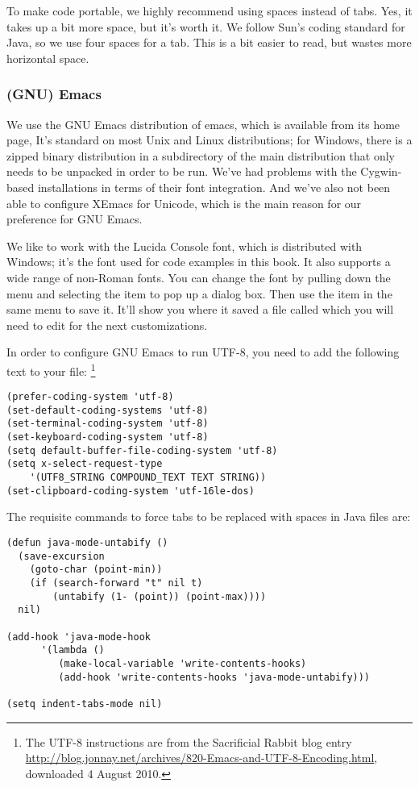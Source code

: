 To make code portable, we highly recommend using spaces instead of
tabs.  Yes, it takes up a bit more space, but it's worth it.  We
follow Sun's coding standard for Java, so we use four spaces for a
tab.  This is a bit easier to read, but wastes more horizontal space.

\subsubsection{(GNU) Emacs}

We use the GNU Emacs distribution of emacs, which is available from
its home page,
%
%
It's standard on most Unix and Linux distributions; for Windows, there
is a zipped binary distribution in a subdirectory of the main
distribution that only needs to be unpacked in order to be run.  We've
had problems with the Cygwin-based installations in terms of their
font integration.  And we've also not been able to configure XEmacs
for Unicode, which is the main reason for our preference for GNU Emacs.

We like to work with the Lucida Console font, which is distributed
with Windows; it's the font used for code examples in this book.  It
also supports a wide range of non-Roman fonts.  You can change the
font by pulling down the  menu and selecting the
 item to pop up a dialog box.  Then use
the  item in the same menu to save it.  It'll show
you where it saved a file called  which you will need
to edit for the next customizations.

In order to configure GNU Emacs to run UTF-8, you need to add
the following text to your  file:%
%
\footnote{The UTF-8 instructions are from the Sacrificial Rabbit blog entry
  \url{http://blog.jonnay.net/archives/820-Emacs-and-UTF-8-Encoding.html},
  downloaded 4 August 2010.}
%
\begin{verbatim}
(prefer-coding-system 'utf-8)
(set-default-coding-systems 'utf-8)
(set-terminal-coding-system 'utf-8)
(set-keyboard-coding-system 'utf-8)
(setq default-buffer-file-coding-system 'utf-8)
(setq x-select-request-type 
    '(UTF8_STRING COMPOUND_TEXT TEXT STRING))
(set-clipboard-coding-system 'utf-16le-dos)
\end{verbatim}
%
The requisite commands to force tabs to be replaced with spaces in
Java files are: 
%
\begin{verbatim}
(defun java-mode-untabify ()
  (save-excursion
    (goto-char (point-min))
    (if (search-forward "t" nil t)
        (untabify (1- (point)) (point-max))))
  nil)

(add-hook 'java-mode-hook
      '(lambda ()
         (make-local-variable 'write-contents-hooks)
         (add-hook 'write-contents-hooks 'java-mode-untabify)))

(setq indent-tabs-mode nil)
\end{verbatim}


